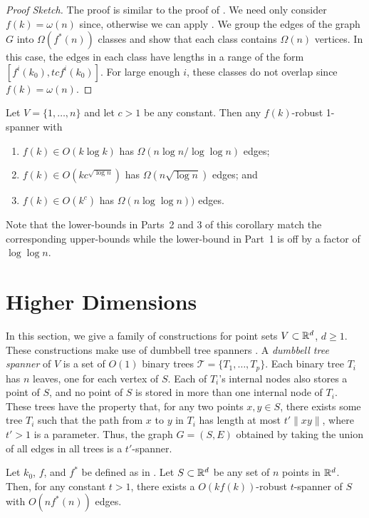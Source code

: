 \documentclass{patmorin}
\begin{document}
\begin{proof}[Proof Sketch]
The proof is similar to the proof of .
We need only consider $f(k)=\omega(n)$ since, otherwise we can apply
.  We group the edges of the graph $G$ into
$\Omega(f^*(n))$ classes and show that each class contains $\Omega(n)$
vertices.  In this case, the edges in each class have lengths in a
range of the form $[f^i(k_0),tcf^{i}(k_0)]$.  For large enough $i$,
these classes do not overlap since $f(k)=\omega(n)$.
\end{proof}

\begin{cor}
Let $V=\{1,\ldots,n\}$ and let $c>1$ be any constant.  Then any $f(k)$-robust 1-spanner with 
\begin{enumerate}
  \item $f(k)\in O(k\log k)$ has $\Omega(n\log n/\log\log n)$ edges;
  \item $f(k)\in O(kc^{\sqrt{\log n}})$ has $\Omega(n\sqrt{\log n})$ edges; and
  \item $f(k)\in O(k^{c})$ has $\Omega(n\log\log n))$ edges.
\end{enumerate}
\end{cor}

Note that the lower-bounds in Parts~2 and 3 of this corollary match the
corresponding upper-bounds while the lower-bound in Part~1 is off by a
factor of $\log\log n$.


\section{Higher Dimensions}

In this section, we give a family of constructions for point sets
$V\subset\mathbb{R}^d$, $d\ge 1$.  These constructions make use of dumbbell
tree spanners \cite[Chapter~11]{ns07}.  A \emph{dumbbell tree spanner}
of $V$ is a set of $O(1)$ binary trees $\mathcal{T}=\{T_1,\ldots,T_p\}$.
Each binary tree $T_i$ has $n$ leaves, one for each vertex of $S$.
Each of $T_i$'s internal nodes also stores a point of $S$, and no point
of $S$ is stored in more than one internal node of $T_i$.  These trees
have the property that, for any two points $x,y\in S$, there exists some
tree $T_i$ such that the path from $x$ to $y$ in $T_i$ has length at
most $t'\|xy\|$, where $t'>1$ is a parameter.  Thus, the graph $G=(S,E)$
obtained by taking the union of all edges in all trees is a $t'$-spanner.

\begin{thm}
Let $k_0$, $f$, and $f^*$ be defined as in .
Let $S\subset \mathbb{R}^d$ be any set of $n$ points in $\mathbb{R}^d$.  Then, for any
constant $t>1$,  there exists a $O(kf(k))$-robust $t$-spanner of $S$
with $O(nf^*(n))$ edges.
\end{thm}
\end{document}
